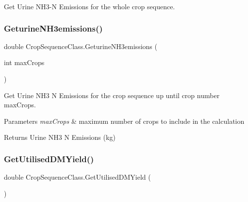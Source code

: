Get Urine N\+H3-\/N Emissions for the whole crop sequence. 

\mbox{\label{class_crop_sequence_class_a860cad5b4e23c37dee4bd95ecf59ffd5}} 
\subsubsection{\texorpdfstring{GeturineNH3emissions()}{GeturineNH3emissions()}\hspace{0.1cm}{\footnotesize\ttfamily [2/2]}}
{\footnotesize\ttfamily double Crop\+Sequence\+Class.\+Geturine\+N\+H3emissions (\begin{DoxyParamCaption}\item[{int}]{max\+Crops }\end{DoxyParamCaption})\hspace{0.3cm}{\ttfamily [inline]}}



Get Urine N\+H3 N Emissions for the crop sequence up until crop number max\+Crops. 


\begin{DoxyParams}{Parameters}
{\em max\+Crops} & maximum number of crops to include in the calculation \\
\hline
\end{DoxyParams}
\begin{DoxyReturn}{Returns}
Urine N\+H3 N Emissions (kg) 
\end{DoxyReturn}
\mbox{\label{class_crop_sequence_class_a837331c0bae96fccef99bc094943c818}} 
\subsubsection{\texorpdfstring{GetUtilisedDMYield()}{GetUtilisedDMYield()}}
{\footnotesize\ttfamily double Crop\+Sequence\+Class.\+Get\+Utilised\+D\+M\+Yield (\begin{DoxyParamCaption}{ }\end{DoxyParamCaption})\hspace{0.3cm}{\ttfamily [inline]}}



